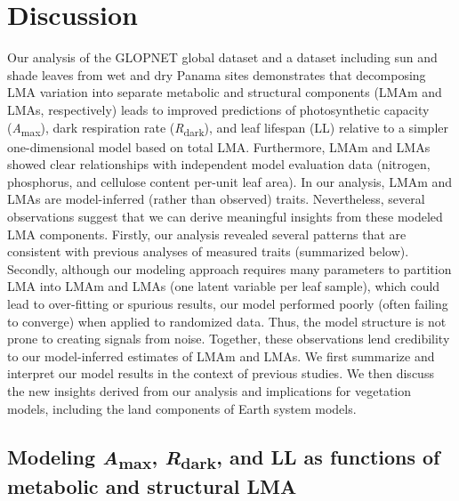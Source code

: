 \documentclass[
  12pt,
  letterpaper,
  DIV=11,
  numbers=noendperiod]{scrartcl}
\begin{document}
\hypertarget{discussion}{%
\section{Discussion}\label{discussion}}

Our analysis of the GLOPNET global dataset and a dataset including sun
and shade leaves from wet and dry Panama sites demonstrates that
decomposing LMA variation into separate metabolic and structural
components (LMAm and LMAs, respectively) leads to improved predictions
of photosynthetic capacity (\emph{A}\textsubscript{max}), dark
respiration rate (\emph{R}\textsubscript{dark}), and leaf lifespan (LL)
relative to a simpler one-dimensional model based on total LMA.
Furthermore, LMAm and LMAs showed clear relationships with independent
model evaluation data (nitrogen, phosphorus, and cellulose content
per-unit leaf area). In our analysis, LMAm and LMAs are model-inferred
(rather than observed) traits. Nevertheless, several observations
suggest that we can derive meaningful insights from these modeled LMA
components. Firstly, our analysis revealed several patterns that are
consistent with previous analyses of measured traits (summarized below).
Secondly, although our modeling approach requires many parameters to
partition LMA into LMAm and LMAs (one latent variable per leaf sample),
which could lead to over-fitting or spurious results, our model
performed poorly (often failing to converge) when applied to randomized
data. Thus, the model structure is not prone to creating signals from
noise. Together, these observations lend credibility to our
model-inferred estimates of LMAm and LMAs. We first summarize and
interpret our model results in the context of previous studies. We then
discuss the new insights derived from our analysis and implications for
vegetation models, including the land components of Earth system models.

\hypertarget{modeling-amax-rdark-and-ll-as-functions-of-metabolic-and-structural-lma}{%
\subsection{\texorpdfstring{Modeling \emph{A}\textsubscript{max},
\emph{R}\textsubscript{dark}, and LL as functions of metabolic and
structural
LMA}{Modeling Amax, Rdark, and LL as functions of metabolic and structural LMA}}\label{modeling-amax-rdark-and-ll-as-functions-of-metabolic-and-structural-lma}}
\end{document}
